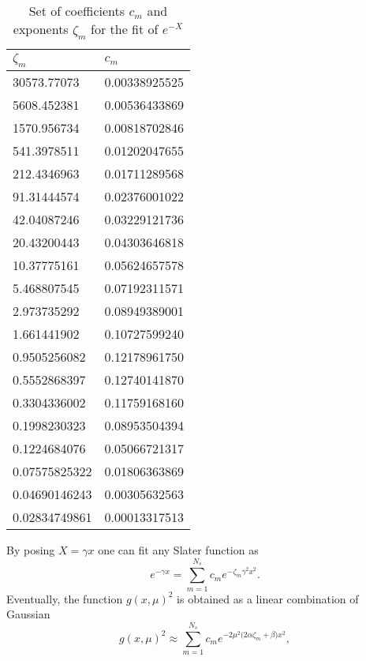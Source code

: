\documentclass[aip,jcp,reprint,noshowkeys,superscriptaddress]{revtex4-1}
\begin{document}
\begin{table}
\label{gauss_fit}
\caption{Set of coefficients $c_m$ and exponents $\zeta_m$ for the fit of $e^{-X}$}
\begin{ruledtabular}
\begin{tabular}{ll}
 $\zeta_m$ & $c_m$ \\
\hline                 
   30573.77073         & 0.00338925525  \\
   5608.452381         & 0.00536433869  \\
   1570.956734         & 0.00818702846  \\
   541.3978511         & 0.01202047655  \\
   212.4346963         & 0.01711289568  \\
   91.31444574         & 0.02376001022  \\
   42.04087246         & 0.03229121736  \\
   20.43200443         & 0.04303646818  \\
   10.37775161         & 0.05624657578  \\
   5.468807545         & 0.07192311571  \\
   2.973735292         & 0.08949389001  \\
   1.661441902         & 0.10727599240  \\
   0.9505256082        & 0.12178961750  \\
   0.5552868397        & 0.12740141870  \\
   0.3304336002        & 0.11759168160  \\
   0.1998230323        & 0.08953504394  \\
   0.1224684076        & 0.05066721317  \\
   0.07575825322       & 0.01806363869  \\
   0.04690146243       & 0.00305632563  \\
   0.02834749861       & 0.00013317513  \\
\end{tabular}
\end{ruledtabular}
\end{table}
By posing $X=\gamma x$ one can fit any Slater function as
\begin{equation}
 e^{-\gamma x} = \sum_{m=1}^{N_s} c_m e^{-\zeta_m \gamma^2 x^2}. 
\end{equation}
Eventually, the function $g(x,\mu)^2$ is obtained as a linear combination of Gaussian
\begin{equation}
 g(x,\mu)^2 \approx \sum_{m=1}^{N_s} c_m e^{-2\mu^2\big(2 \alpha \zeta_m + \beta\big) x^2},
\end{equation}
\end{document}
